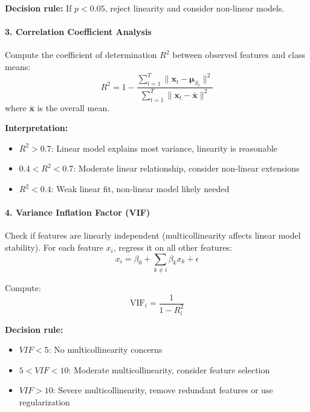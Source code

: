 \documentclass[11pt,a4paper]{article}
\newcommand{\bx}{\mathbf{x}}
\newcommand{\bmu}{\boldsymbol{\mu}}
\begin{document}
\textbf{Decision rule:} If $p < 0.05$, reject linearity and consider non-linear models.

\paragraph{3. Correlation Coefficient Analysis}

Compute the coefficient of determination $R^2$ between observed features and class means:
\begin{equation}
R^2 = 1 - \frac{\sum_{t=1}^{T} \|\bx_t - \bmu_{S_t}\|^2}{\sum_{t=1}^{T} \|\bx_t - \bar{\bx}\|^2}
\end{equation}
where $\bar{\bx}$ is the overall mean.

\textbf{Interpretation:}
\begin{itemize}[leftmargin=*]
    \item $R^2 > 0.7$: Linear model explains most variance, linearity is reasonable
    \item $0.4 < R^2 < 0.7$: Moderate linear relationship, consider non-linear extensions
    \item $R^2 < 0.4$: Weak linear fit, non-linear model likely needed
\end{itemize}

\paragraph{4. Variance Inflation Factor (VIF)}

Check if features are linearly independent (multicollinearity affects linear model stability). For each feature $x_i$, regress it on all other features:
\begin{equation}
x_i = \beta_0 + \sum_{k \neq i} \beta_k x_k + \epsilon
\end{equation}

Compute:
\begin{equation}
\text{VIF}_i = \frac{1}{1 - R_i^2}
\end{equation}

\textbf{Decision rule:}
\begin{itemize}[leftmargin=*]
    \item $VIF < 5$: No multicollinearity concerns
    \item $5 < VIF < 10$: Moderate multicollinearity, consider feature selection
    \item $VIF > 10$: Severe multicollinearity, remove redundant features or use regularization
\end{itemize}
\end{document}
